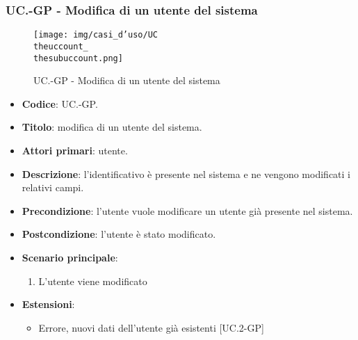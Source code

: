 		\subsubsection{UC\theuccount.\thesubuccount-GP - Modifica di un utente del sistema}
			\begin{figure}[H]
				\centering
				\texttt{[image: img/casi\_d'uso/UC\\theuccount\_\\thesubuccount.png]}\\
				\caption{UC\theuccount.\thesubuccount-GP - Modifica di un utente del sistema}
			\end{figure}
			\begin{itemize}
				\item \textbf{Codice}: UC\theuccount.\thesubuccount-GP.
				\item \textbf{Titolo}: modifica di un utente del sistema.
				\item \textbf{Attori primari}: utente.
				\item \textbf{Descrizione}: l'identificativo è presente nel sistema e ne vengono modificati i relativi campi.
				\item \textbf{Precondizione}: l'utente vuole modificare un utente già presente nel sistema.
				\item \textbf{Postcondizione}: l'utente è stato modificato.
				\item \textbf{Scenario principale}:
				\begin{enumerate}
					\item L'utente viene modificato
				\end{enumerate}
				\item \textbf{Estensioni}:
				\begin{itemize}
					\item Errore, nuovi dati dell'utente già esistenti [UC\theuccount.2-GP]
				\end{itemize}
			\end{itemize}

